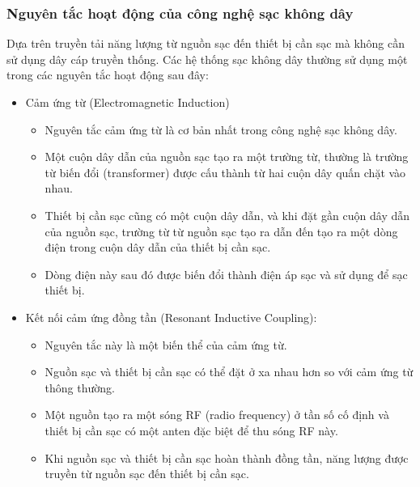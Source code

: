 \documentclass{article} %
\begin{document}
\subsubsection{Nguyên tắc hoạt động của công nghệ sạc không dây}
Dựa trên truyền tải năng lượng từ nguồn sạc đến thiết bị cần sạc mà không cần sử dụng dây cáp truyền thống. Các hệ thống sạc không dây thường sử dụng một trong các nguyên tắc hoạt động sau đây:
\begin{itemize}
    \item Cảm ứng từ (Electromagnetic Induction)
        \begin{itemize}
            \item Nguyên tắc cảm ứng từ là cơ bản nhất trong công nghệ sạc không dây.
            \item Một cuộn dây dẫn của nguồn sạc tạo ra một trường từ, thường là trường từ biến đổi (transformer) được cấu thành từ hai cuộn dây quấn chặt vào nhau.
            \item Thiết bị cần sạc cũng có một cuộn dây dẫn, và khi đặt gần cuộn dây dẫn của nguồn sạc, trường từ từ nguồn sạc tạo ra dẫn đến tạo ra một dòng điện trong cuộn dây dẫn của thiết bị cần sạc.
            \item Dòng điện này sau đó được biến đổi thành điện áp sạc và sử dụng để sạc thiết bị.
    
        \end{itemize}
    \item Kết nối cảm ứng đồng tần (Resonant Inductive Coupling):
        \begin{itemize}
            \item Nguyên tắc này là một biến thể của cảm ứng từ.
            \item Nguồn sạc và thiết bị cần sạc có thể đặt ở xa nhau hơn so với cảm ứng từ thông thường.
            \item Một nguồn tạo ra một sóng RF (radio frequency) ở tần số cố định và thiết bị cần sạc có một anten đặc biệt để thu sóng RF này.
            \item Khi nguồn sạc và thiết bị cần sạc hoàn thành đồng tần, năng lượng được truyền từ nguồn sạc đến thiết bị cần sạc.


\end{itemize}
\end{itemize}
\end{document}

